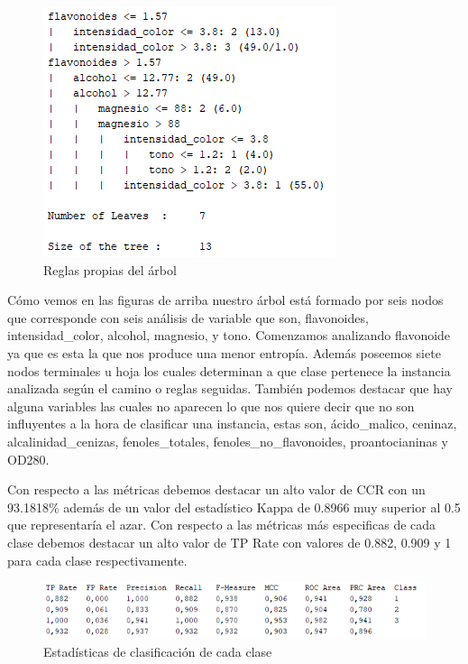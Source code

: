 \begin{figure}[H]
    \centering
    \includegraphics[width=\textwidth]{img/Reglas.PNG}
    \caption{Reglas propias del árbol}
    
\end{figure}

Cómo vemos en las figuras de arriba nuestro árbol está formado por seis nodos que corresponde con seis análisis de variable que son, flavonoides, intensidad\_color, alcohol, magnesio, y tono. Comenzamos analizando flavonoide ya que es esta la que nos produce una menor entropía. Además poseemos siete nodos terminales u hoja los cuales determinan a que clase pertenece la instancia analizada según el camino o reglas seguidas. También podemos destacar que hay alguna variables las cuales no aparecen lo que nos quiere decir que no son influyentes a la hora de clasificar una instancia, estas son, ácido\_malico, ceninaz, alcalinidad\_cenizas, fenoles\_totales, fenoles\_no\_flavonoides, proantocianinas y OD280.

Con respecto a las métricas debemos destacar un alto valor de CCR con un 93.1818\% además de un valor del estadístico Kappa de 0.8966 muy superior al 0.5 que representaría el azar. Con respecto a las métricas más especificas de cada clase debemos destacar un alto valor de TP Rate con valores de 0.882, 0.909 y 1 para cada clase respectivamente.
\begin{figure}[H]
    \centering
    \includegraphics[width=\textwidth]{img/EC4.5.PNG}
    \caption{Estadísticas de clasificación de cada clase}
    
\end{figure}

